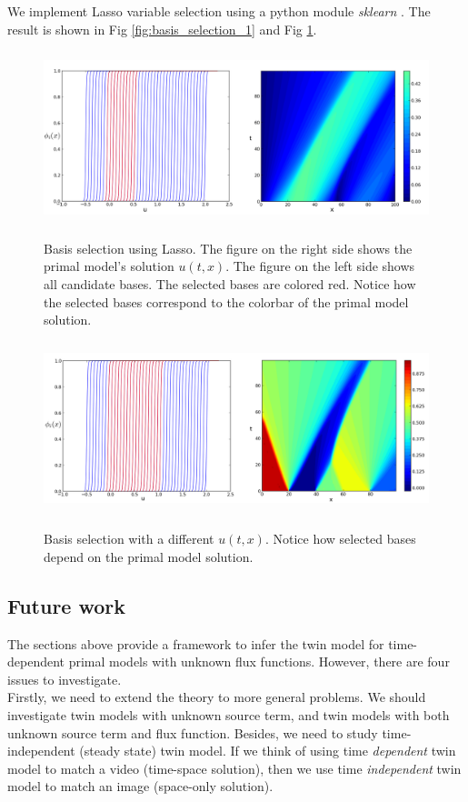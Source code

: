 \documentclass[a4paper,onecolumn]{article}
\theoremstyle{remark}
\begin{document}
\noindent We implement Lasso variable selection using a python module \emph{sklearn} \cite{sklearn}.
The result is shown in Fig \ref{fig:basis_selection_1} and Fig \ref{fig:basis_selection_2}.
\begin{figure}[H]\begin{center}
    \includegraphics[height=5cm]{all.png}
    \caption{Basis selection using Lasso. The figure on the right side shows
    the primal model's solution $u(t,x)$. The figure on the left side shows all
    candidate bases. The selected bases are colored red. Notice how the selected
    bases correspond to the colorbar of the primal model solution.}
    \label{fig:basis_selection_1}
    \includegraphics[height=5cm]{all2.png}
    \caption{Basis selection with a different $u(t,x)$. Notice
    how selected bases depend on the primal model solution.}
    \label{fig:basis_selection_2}
\end{center}
\end{figure}

\subsection{Future work}
\label{future work}
The sections above provide a framework to infer the twin model for time-dependent primal models 
with unknown flux functions. However, there are four issues to investigate.\\

\noindent Firstly, we need to extend the theory to more general problems.
We should investigate twin models with unknown source term, and
twin models with both unknown source term and flux function.
Besides, we need to study time-independent (steady state) twin model.
If we think of using time \emph{dependent} twin model to match a video (time-space solution),
then we use time \emph{independent} twin model to match an image (space-only solution).\\
\end{document}
